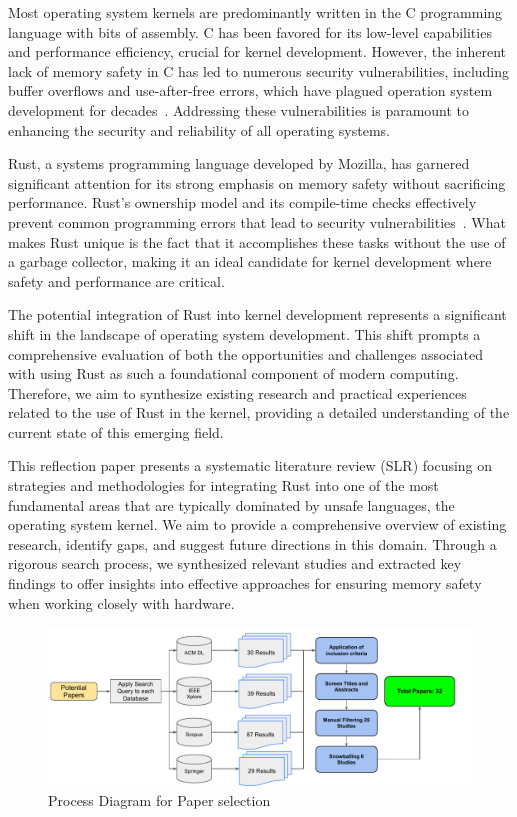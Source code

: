 \documentclass[sigconf]{acmart}
\begin{document}
Most operating system kernels are predominantly written in the C programming language with bits of
assembly. C has been favored for its low-level capabilities and performance efficiency, crucial for
kernel development. However, the inherent lack of memory safety in C has led to numerous security
vulnerabilities, including buffer overflows and use-after-free errors, which have plagued operation
system development for decades~\cite{MSRC_Team2019-bf}. Addressing these vulnerabilities is
paramount to enhancing the security and reliability of all operating systems.

Rust, a systems programming language developed by Mozilla, has garnered significant attention for
its strong emphasis on memory safety without sacrificing performance. Rust's ownership model and its
compile-time checks effectively prevent common programming errors that lead to security
vulnerabilities~\cite{Klabnik2024-id}. What makes Rust unique is the fact that it accomplishes these tasks without the use of a garbage collector, making it an ideal candidate for kernel development where safety and performance are critical.

The potential integration of Rust into kernel development represents a significant shift in the
landscape of operating system development. This shift prompts a comprehensive evaluation of both the
opportunities and challenges associated with using Rust as such a foundational component of modern
computing. Therefore, we aim to synthesize existing research and practical
experiences related to the use of Rust in the kernel, providing a detailed understanding of
the current state of this emerging field.

This reflection paper presents a systematic literature review (SLR) focusing on strategies and methodologies
for integrating Rust into one of the most fundamental areas that are typically dominated by unsafe
languages, the operating system kernel. We aim to provide a comprehensive overview of
existing research, identify gaps, and suggest future directions in this domain. Through a rigorous
search process, we synthesized relevant studies and extracted key findings to offer insights into
effective approaches for ensuring memory safety when working closely with hardware.

 \begin{figure}
    \centering
     \includegraphics[width=7in]{process-diagram.pdf}
     \caption{Process Diagram for Paper selection}
     \label{fig:process}
 \end{figure}
 
\end{document}

